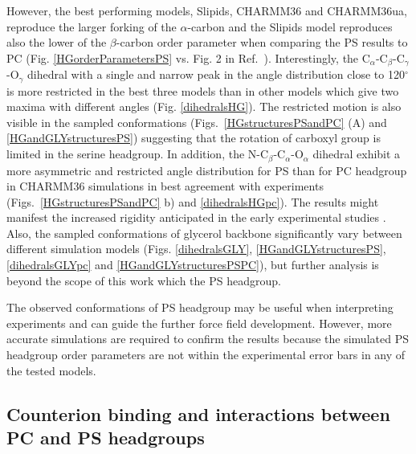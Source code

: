 \documentclass[aps,prl,superscriptaddress,twocolumn]{revtex4}
\begin{document}
However, the best performing models,
Slipids, CHARMM36 and CHARMM36ua, reproduce the larger forking of the $\alpha$-carbon 
and the Slipids model reproduces also the lower of the $\beta$-carbon order parameter
when comparing the PS results to PC (Fig. \ref{HGorderParametersPS} vs. Fig. 2 in Ref.~).
Interestingly, the C$_\alpha$-C$_\beta$-C$_\gamma$-O$_\gamma$  dihedral with
a single and narrow peak in the angle distribution close to 120$^{\circ}$ is more restricted
in the best three models than in other models which give two maxima with different angles (Fig. \ref{dihedralsHG}).
The restricted motion is also
visible in the sampled conformations (Figs.~\ref{HGstructuresPSandPC} (A) and \ref{HGandGLYstructuresPS})
suggesting that the rotation of carboxyl group is limited in the serine headgroup.
In addition, the N-C$_\beta$-C$_\alpha$-O$_\alpha$ dihedral exhibit a more asymmetric
and restricted angle distribution for PS than for PC headgroup in
CHARMM36 simulations in best agreement with experiments
(Figs.~\ref{HGstructuresPSandPC} b) and \ref{dihedralsHGpc}).
The results might manifest the increased rigidity anticipated in the early experimental studies \cite{browning80,buldt81}.
Also, the sampled conformations of glycerol backbone
significantly vary between different simulation models 
(Figs. \ref{dihedralsGLY}, \ref{HGandGLYstructuresPS}, \ref{dihedralsGLYpc} and \ref{HGandGLYstructuresPSPC}),
but further analysis is beyond the scope of this work which the PS headgroup.

The observed conformations of PS headgroup may be useful when interpreting experiments and
can guide the further force field development. However, more accurate simulations are
required to confirm the results because the simulated PS headgroup order parameters
are not within the experimental error bars in any of the tested models.


%



\subsection{Counterion binding and interactions between PC and PS headgroups}\label{ciBINDINGsection}
\end{document}
